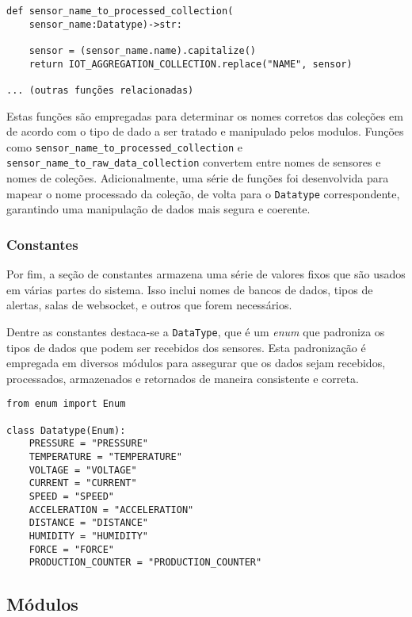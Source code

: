 \begin{verbatim}
def sensor_name_to_processed_collection(
    sensor_name:Datatype)->str:
    
    sensor = (sensor_name.name).capitalize()
    return IOT_AGGREGATION_COLLECTION.replace("NAME", sensor)

... (outras funções relacionadas)
\end{verbatim}

Estas funções são empregadas para determinar os nomes corretos das coleções em de acordo com o tipo de dado a ser tratado e manipulado pelos modulos. Funções como \texttt{sensor\_name\_to\_processed\_collection} e \texttt{sensor\_name\_to\_raw\_data\_collection} convertem entre nomes de sensores e nomes de coleções. 
Adicionalmente, uma série de funções foi desenvolvida para mapear o nome processado da coleção, de volta para o \texttt{Datatype} correspondente, garantindo uma manipulação de dados mais segura e coerente.


\subsubsection{Constantes}
Por fim, a seção de constantes armazena uma série de valores fixos que são usados em várias partes do sistema. Isso inclui nomes de bancos de dados, tipos de alertas, salas de websocket, e outros que forem necessários.

Dentre as constantes destaca-se a \texttt{DataType}, que é um \textit{enum} que padroniza os tipos de dados que podem ser recebidos dos sensores. Esta padronização é empregada em diversos módulos para assegurar que os dados sejam recebidos, processados, armazenados e retornados de maneira consistente e correta.

\begin{verbatim}
from enum import Enum

class Datatype(Enum):
    PRESSURE = "PRESSURE"
    TEMPERATURE = "TEMPERATURE"
    VOLTAGE = "VOLTAGE"
    CURRENT = "CURRENT"
    SPEED = "SPEED"
    ACCELERATION = "ACCELERATION"
    DISTANCE = "DISTANCE"
    HUMIDITY = "HUMIDITY"
    FORCE = "FORCE"
    PRODUCTION_COUNTER = "PRODUCTION_COUNTER"
\end{verbatim}

\subsection{Módulos}\label{subsec:modules}

